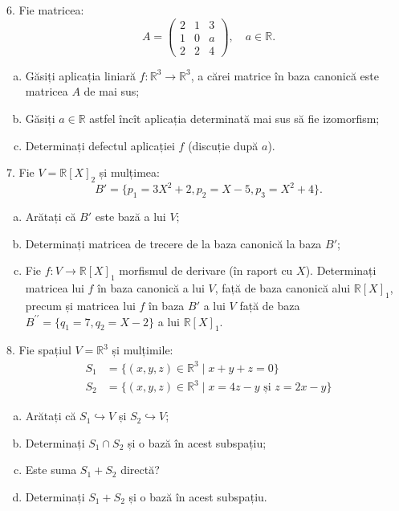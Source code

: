 \documentclass[11pt,a4paper]{article}
\newcommand\RR{\mathbb{R}}
\theoremstyle{dotless}
\theoremstyle{dotlessdr}
\begin{document}
\vspace{1cm}

6. Fie matricea:
\[
  A = \begin{pmatrix}
    2 & 1 & 3 \\
    1 & 0 & a \\
    2 & 2 & 4
  \end{pmatrix}, \quad a \in \RR.
\]
\begin{enumerate}[(a)]
\item Găsiți aplicația liniară $f : \RR^3 \to \RR^3$, a cărei matrice
  în baza canonică este matricea $A$ de mai sus;
\item Găsiți $a \in \RR$ astfel încît aplicația determinată mai sus să fie
  izomorfism;
\item Determinați defectul aplicației $f$ (discuție după $a$).
\end{enumerate}

\vspace{1cm}

7. Fie $V = \RR[X]_2$ și mulțimea:
\[
  B' = \{ p_1 = 3X^2 + 2, p_2 = X - 5, p_3 = X^2 + 4 \}.
\]
\begin{enumerate}[(a)]
\item Arătați că $B'$ este bază a lui $V$;
\item Determinați matricea de trecere de la baza canonică la baza $B'$;
\item Fie $f : V \to \RR[X]_1$ morfismul de derivare (în raport cu $X$).
  Determinați matricea lui $f$ în baza canonică a lui $V$, față de baza canonică
  alui $\RR[X]_1$, precum și matricea lui $f$ în baza $B'$ a lui $V$
  față de baza $B^{\prime\prime} = \{ q_1 = 7, q_2 = X - 2 \}$ a lui $\RR[X]_1$.
\end{enumerate}

\vspace{1cm}

8. Fie spațiul $V = \RR^3$ și mulțimile:
\begin{align*}
  S_1 &= \{ (x, y, z) \in \RR^3 \mid x + y + z = 0 \} \\
  S_2 &= \{ (x, y, z) \in \RR^3 \mid x = 4z - y \text{ și } z = 2x - y \}
\end{align*}

\begin{enumerate}[(a)]
\item Arătați că $S_1 \hookrightarrow V$ și $S_2 \hookrightarrow V$;
\item Determinați $S_1 \cap S_2$ și o bază în acest subspațiu;
\item Este suma $S_1 + S_2$ directă?
\item Determinați $S_1 + S_2$ și o bază în acest subspațiu.
\end{enumerate}
\end{document}
